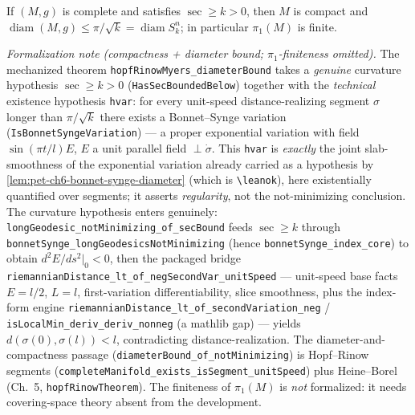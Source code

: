 \begin{corollary}
  \label{cor:pet-ch6-hopf-rinow-myers-diameter}
  \leanok
  If $(M,g)$ is complete and satisfies $\sec\ge k>0$, then $M$ is compact and
  $\operatorname{diam}(M,g)\le\pi/\sqrt k=\operatorname{diam}S^n_k$; in particular $\pi_1(M)$ is
  finite.

  \emph{Formalization note (compactness + diameter bound; $\pi_1$-finiteness omitted).} The
  mechanized theorem \texttt{hopfRinowMyers\_diameterBound} takes a \emph{genuine} curvature
  hypothesis $\sec\ge k>0$ (\texttt{HasSecBoundedBelow}) together with the \emph{technical}
  existence hypothesis \texttt{hvar}: for every unit-speed distance-realizing segment $\sigma$
  longer than $\pi/\sqrt k$ there exists a Bonnet--Synge variation
  (\texttt{IsBonnetSyngeVariation}) --- a proper exponential variation with field $\sin(\pi
  t/l)E$, $E$ a unit parallel field $\perp\dot\sigma$. This \texttt{hvar} is \emph{exactly} the
  joint slab-smoothness of the exponential variation already carried as a hypothesis by
  \cref{lem:pet-ch6-bonnet-synge-diameter} (which is \texttt{\textbackslash leanok}), here
  existentially quantified over segments; it asserts \emph{regularity}, not the not-minimizing
  conclusion. The curvature hypothesis enters genuinely:
  \texttt{longGeodesic\_notMinimizing\_of\_secBound} feeds $\sec\ge k$ through
  \texttt{bonnetSynge\_longGeodesicsNotMinimizing} (hence \texttt{bonnetSynge\_index\_core}) to
  obtain $d^2E/ds^2|_0<0$, then the packaged bridge
  \texttt{riemannianDistance\_lt\_of\_negSecondVar\_unitSpeed} --- unit-speed base facts $E=l/2$,
  $L=l$, first-variation differentiability, slice smoothness, plus the index-form engine
  \texttt{riemannianDistance\_lt\_of\_secondVariation\_neg} /
  \texttt{isLocalMin\_deriv\_deriv\_nonneg} (a mathlib gap) --- yields $d(\sigma(0),\sigma(l))<l$,
  contradicting distance-realization. The diameter-and-compactness passage
  (\texttt{diameterBound\_of\_notMinimizing}) is Hopf--Rinow segments
  (\texttt{completeManifold\_exists\_isSegment\_unitSpeed}) plus Heine--Borel (Ch.~5,
  \texttt{hopfRinowTheorem}). The finiteness of $\pi_1(M)$ is \emph{not} formalized: it needs
  covering-space theory absent from the development.
\end{corollary}
